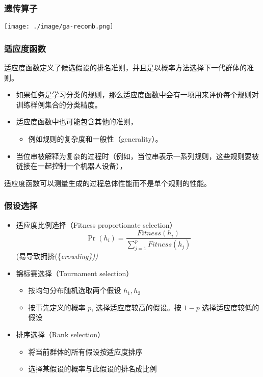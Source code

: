 \documentclass{beamer}
\begin{document}
\begin{frame}
\frametitle{遗传算子}
\label{sec-3-5}

\texttt{[image: ./image/ga-recomb.png]}
\end{frame}
\begin{frame}
\frametitle{适应度函数}
\label{sec-3-6}

适应度函数定义了候选假设的排名准则，并且是以概率方法选择下一代群体的准则。
\begin{itemize}
\item 如果任务是学习分类的规则，那么适应度函数中会有一项用来评价每个规则对训练样例集合的分类精度。
\item 适应度函数中也可能包含其他的准则，
\begin{itemize}
\item 例如规则的复杂度和一般性（generality）。
\end{itemize}
\item 当位串被解释为复杂的过程时（例如，当位串表示一系列规则，这些规则要被链接在一起控制一个机器人设备），
\end{itemize}
适应度函数可以测量生成的过程总体性能而不是单个规则的性能。
\end{frame}
\begin{frame}
\frametitle{假设选择}
\label{sec-3-7}

\begin{itemize}
\item 适应度比例选择（Fitness proportionate selection）
    \[ \Pr(h_{i}) = \frac{Fitness(h_{i})}{\sum_{j=1}^{p} Fitness(h_{j})} \]
    (易导致拥挤(\{\em crowding\}))
\item 锦标赛选择（Tournament selection）
\begin{itemize}
\item 按均匀分布随机选取两个假设 $h_1, h_2$
\item 按事先定义的概率 $p$, 选择适应度较高的假设。按 $1-p$ 选择适应度较低的假设
\end{itemize}
\item 排序选择（Rank selection）
\begin{itemize}
\item 将当前群体的所有假设按适应度排序
\item 选择某假设的概率与此假设的排名成比例
\end{itemize}
\end{itemize}
\end{frame}
\end{document}
